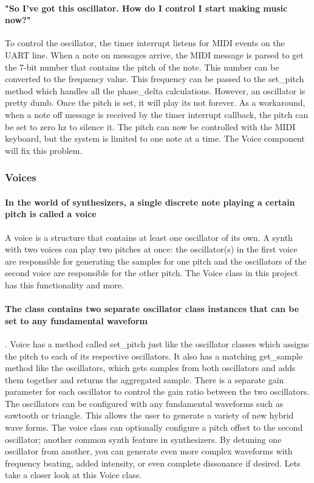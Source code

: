 \documentclass[acmlarge,screen]{acmart}
\begin{document}
	\paragraph{"So I've got this oscillator. How do I control I start making music now?"} To control the oscillator, the timer interrupt listens for MIDI events on the UART line. When a note on messages arrive, the MIDI message is parsed to get the 7-bit number that contains the pitch of the note. This number can be converted to the frequency value. This frequency can be passed to the set\_pitch method which handles all the phase\_delta calculations. However, an oscillator is pretty dumb. Once the pitch is set, it will play its not forever. As a workaround, when a note off message is received by the timer interrupt callback, the pitch can be set to zero hz to silence it. The pitch can now be controlled with the MIDI keyboard, but the system is limited to one note at a time. The Voice component will fix this problem.
	
	\subsubsection{Voices}
	\paragraph{In the world of synthesizers, a single discrete note playing a certain pitch is called a voice} A voice is a structure that contains at least one oscillator of its own. A synth with two voices can play two pitches at once: the oscillator(s) in the first voice are responsible for generating the samples for one pitch and the oscillators of the second voice are responsible for the other pitch. The Voice class in this project has this functionality and more.
	
	\paragraph{The class contains two separate oscillator class instances that can be set to any fundamental waveform}. Voice has a method called set\_pitch just like the oscillator classes which assigns the pitch to each of its respective oscillators. It also has a matching get\_sample method like the oscillators, which gets samples from both oscillators and adds them together and returns the aggregated sample. There is a separate gain parameter for each oscillator to control the gain ratio between the two oscillators. The oscillators can be configured with any fundamental waveforms such as sawtooth or triangle. This allows the user to generate a variety of new hybrid wave forms. The voice class can optionally configure a pitch offset to the second oscillator; another common synth feature in synthesizers. By detuning one oscillator from another, you can generate even more complex waveforms with frequency beating, added intensity, or even complete dissonance if desired. Lets take a closer look at this Voice class.
	
\end{document}
